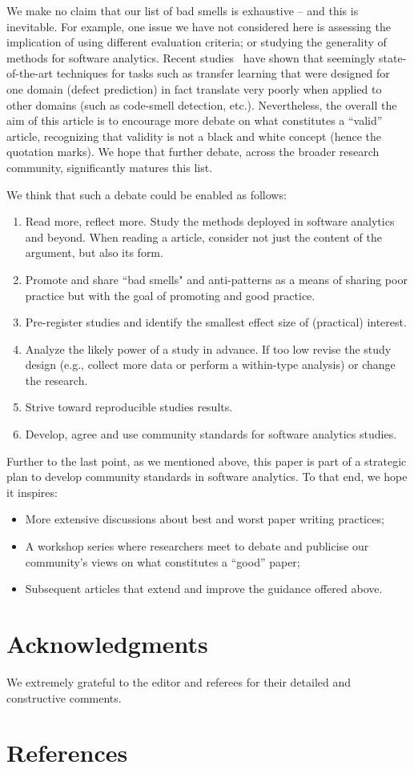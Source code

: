 \documentclass[10pt]{elsarticle}
\newcommand{\bi}{\begin{itemize}}
\newcommand{\ei}{\end{itemize}}
\begin{document}
We make no claim that our  list of bad smells is exhaustive --  and this is inevitable. For example, one issue we have not considered here is assessing the implication of using different evaluation criteria; or studying the generality of methods for software analytics.  Recent studies~\cite{krishna18a} have shown that seemingly state-of-the-art techniques for tasks such as transfer learning that were designed for one domain (defect prediction) in fact translate very poorly when applied to other domains (such as code-smell detection, etc.).
Nevertheless, the overall the aim of this article is to encourage more debate on what constitutes a ``valid'' article, recognizing that validity is not a black and white concept (hence the quotation marks).  We hope that further debate, across the broader research community, significantly matures this list.

We think that such a debate could be enabled as follows:
\begin{enumerate}
    \item Read more, reflect more. Study the methods deployed in software analytics and beyond.%
    When reading a article, consider not just the content of the argument, but also its form.
    \item Promote and share ``bad smells" and anti-patterns as a means of sharing poor practice but with the goal of promoting and good practice.
    \item Pre-register studies and identify the smallest effect size of (practical) interest.
    \item Analyze the likely power of a study in advance. If too low  revise the study design (e.g., collect more data or perform a within-type analysis) or change the research.
    \item Strive toward reproducible studies
    results.
     \item Develop, agree and use community standards  for software analytics studies.
     \end{enumerate}
Further to the last point, as we mentioned above, this paper is part of a strategic plan to develop community standards in software analytics.  To that end, we hope it inspires:
     \bi
     \item More  extensive discussions about best and worst paper writing practices; 
\item A workshop series where researchers meet to debate and publicise our community's views on what constitutes a ``good''  paper;
\item Subsequent articles
that extend and improve the guidance offered above.
\ei
  
\section*{Acknowledgments}
\noindent
We extremely grateful to the editor and referees for their detailed and constructive comments.



\section*{References}


 
\end{document}
